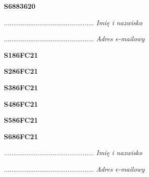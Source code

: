 \begin{turn}{90}\huge \textbf{S6883620}\end{turn}

\begin{turn}{90}\begin{minipage}{\linewidth} \vspace{20mm} ................................................  \textit{Imię i nazwisko}\end{minipage}\end{turn}

\begin{turn}{90}\begin{minipage}{\linewidth} \vspace{20mm} ................................................  \textit{Adres e-mailowy}\end{minipage}\end{turn}

\begin{turn}{90}\huge \textbf{S186FC21}\end{turn}

\begin{turn}{90}\huge \textbf{S286FC21}\end{turn}

\begin{turn}{90}\huge \textbf{S386FC21}\end{turn}

\begin{turn}{90}\huge \textbf{S486FC21}\end{turn}

\begin{turn}{90}\huge \textbf{S586FC21}\end{turn}

\begin{turn}{90}\huge \textbf{S686FC21}\end{turn}

\begin{turn}{90}\begin{minipage}{\linewidth} \vspace{20mm} ................................................  \textit{Imię i nazwisko}\end{minipage}\end{turn}

\begin{turn}{90}\begin{minipage}{\linewidth} \vspace{20mm} ................................................  \textit{Adres e-mailowy}\end{minipage}\end{turn}

